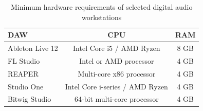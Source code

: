 \begin{table}[h]
\centering
\caption{Minimum hardware requirements of selected digital audio workstations}
\label{tab:daw_hardware_requirements}
\begin{tabular}{|l|c|c|}
\hline
\textbf{DAW} & \textbf{CPU} & \textbf{RAM} \\
\hline
Ableton Live 12 &
Intel Core i5 / AMD Ryzen &
8 GB \\
\hline

FL Studio &
Intel or AMD processor &
4 GB \\
\hline

REAPER &
Multi-core x86 processor &
4 GB \\
\hline

Studio One &
Intel Core i-series / AMD Ryzen &
4 GB \\
\hline

Bitwig Studio &
64-bit multi-core processor &
4 GB \\
\hline

\end{tabular}
\end{table}